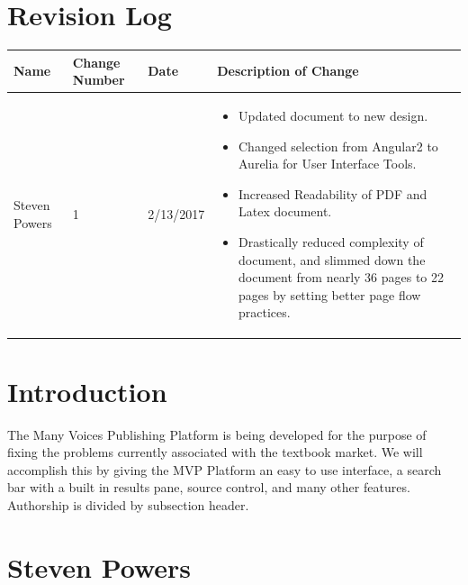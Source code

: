 \documentclass[onecolumn, draftclsnofoot,10pt, compsoc]{IEEEtran}
\begin{document}
\section{Revision Log}
\begin{flushleft}
\tablehead{}
\begin{supertabular}{|p{3cm}|p{3cm}|p{3cm}|p{7cm}|}
\hline
Name & Change Number & Date & Description of Change
\\\hline
Steven Powers & 1 & 2/13/2017 & \begin{itemize}
								\item{Updated document to new design.}
								\item{Changed selection from Angular2 to Aurelia for User Interface Tools.}
								\item{Increased Readability of PDF and Latex document.}
								\item{Drastically reduced complexity of document, 
									and slimmed down the document from nearly 36 pages to 22 
									pages by setting better page flow practices.}
								\end{itemize}
\\ \hline

\end{supertabular}
\end{flushleft}


\bigskip

\section{Introduction}


\noindent The Many Voices Publishing Platform is being developed for the purpose of fixing the problems currently associated with the textbook market. We will accomplish this by giving the MVP Platform an easy to use interface, a search bar with a built in results pane, source control, and many other features. Authorship is divided by subsection header.


\newpage

\section{Steven Powers}
\end{document}
